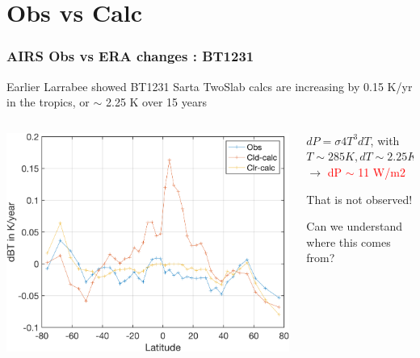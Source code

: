 \documentclass[10pt,t]{beamer}
\begin{document}
\section{Obs vs Calc}
\begin{frame}
  \frametitle{AIRS Obs vs ERA changes : BT1231}

  Earlier Larrabee showed BT1231 Sarta TwoSlab calcs are increasing by
  0.15 K/yr in the tropics, or $\sim$ 2.25 K over 15 years \newline

  \begin{columns}
    \begin{column}{0.65\columnwidth}
      \begin{center}
        \noindent\includegraphics[width=\linewidth]{airs15year_lat_trends_900cm-1.png}
      \end{center}
    \end{column}

    \begin{column}{0.35\columnwidth}

      \vspace{0.1in}
      
      $dP = \sigma 4 T^3 dT$, with $T \sim 285 K, dT \sim 2.25 K $ $\rightarrow $
      \textcolor{red}{dP $\sim$ 11 W/m2} \newline

      That is not observed! \newline
      
      \vspace{0.1in}
      
      Can we understand where this comes from?

    \end{column}    
  \end{columns}
  
\end{frame}
\end{document}
